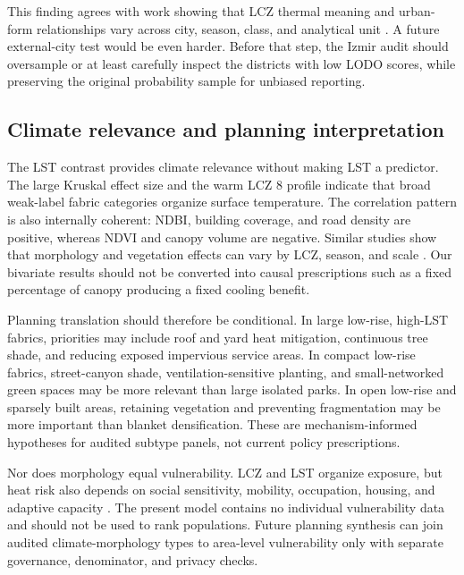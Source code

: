 This finding agrees with work showing that LCZ thermal meaning and urban-form
relationships vary across city, season, class, and analytical unit
\citep{kwok2019WellDoes,deng2024SensitivLocal,
wang2025SeasonalEffects,wu2025ContrastUrban}. A future external-city test would
be even harder. Before that step, the Izmir audit should oversample or at least
carefully inspect the districts with low LODO scores, while preserving the
original probability sample for unbiased reporting.

\subsection{Climate relevance and planning interpretation}

The LST contrast provides climate relevance without making LST a predictor.
The large Kruskal effect size and the warm LCZ 8 profile indicate that broad
weak-label fabric categories organize surface temperature. The correlation pattern is also
internally coherent: NDBI, building coverage, and road density are positive,
whereas NDVI and canopy volume are negative. Similar studies show that
morphology and vegetation effects can vary by LCZ, season, and scale
\citep{zhou2023IdentifyEffects,liu2025UnveilinDifferen,
wang2025SeasonalEffects}. Our bivariate results should not be converted into
causal prescriptions such as a fixed percentage of canopy producing a fixed
cooling benefit.

Planning translation should therefore be conditional. In large low-rise,
high-LST fabrics, priorities may include roof and yard heat mitigation,
continuous tree shade, and reducing exposed impervious service areas. In
compact low-rise fabrics, street-canyon shade, ventilation-sensitive planting,
and small-networked green spaces may be more relevant than large isolated
parks. In open low-rise and sparsely built areas, retaining vegetation and
preventing fragmentation may be more important than blanket densification.
These are mechanism-informed hypotheses for audited subtype panels, not current
policy prescriptions.

Nor does morphology equal vulnerability. LCZ and LST organize exposure, but
heat risk also depends on social sensitivity, mobility, occupation, housing,
and adaptive capacity \citep{ma2023InvestigUrban,mashhoodi2024UrbanForm,
iqbal2025DoesPerceive,turner2025DevelopmValidati}. The present model contains no
individual vulnerability data and should not be used to rank populations.
Future planning synthesis can join audited climate-morphology types to
area-level vulnerability only with separate governance, denominator, and
privacy checks.

